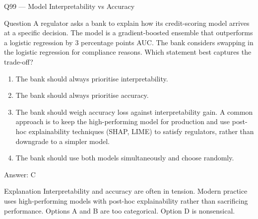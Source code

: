 \documentclass[aspectratio=169,8pt]{beamer}
\begin{document}
\begin{frame}{Q99 --- Model Interpretability vs Accuracy}
\begin{block}{Question}
A regulator asks a bank to explain how its credit-scoring model arrives at a specific decision. The model is a gradient-boosted ensemble that outperforms a logistic regression by 3 percentage points AUC. The bank considers swapping in the logistic regression for compliance reasons. Which statement best captures the trade-off?
\end{block}
\begin{enumerate}
\item The bank should always prioritise interpretability.
\item The bank should always prioritise accuracy.
\item The bank should weigh accuracy loss against interpretability gain. A common approach is to keep the high-performing model for production and use post-hoc explainability techniques (SHAP, LIME) to satisfy regulators, rather than downgrade to a simpler model.
\item The bank should use both models simultaneously and choose randomly.
\end{enumerate}
\begin{exampleblock}{Answer: C}\end{exampleblock}
\begin{block}{Explanation}
Interpretability and accuracy are often in tension. Modern practice uses high-performing models with post-hoc explainability rather than sacrificing performance. Options A and B are too categorical. Option D is nonsensical.
\end{block}
\end{frame}
\end{document}
